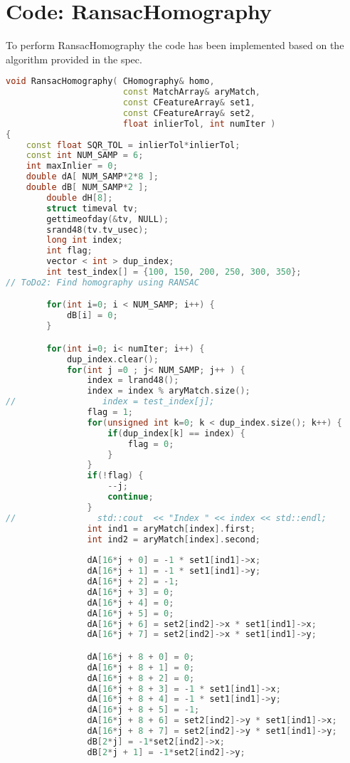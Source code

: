 \documentclass[11pt]{article}
\begin{document}
\section{Code: RansacHomography}
To perform RansacHomography the code has been implemented based on the algorithm provided in the spec.
\begin{lstlisting}[language=C++, caption={RansacHomography}, label=code2]
void RansacHomography( CHomography& homo, 
                       const MatchArray& aryMatch, 
                       const CFeatureArray& set1, 
                       const CFeatureArray& set2, 
                       float inlierTol, int numIter )
{
	const float SQR_TOL = inlierTol*inlierTol;
	const int NUM_SAMP = 6;
	int maxInlier = 0;
	double dA[ NUM_SAMP*2*8 ];
	double dB[ NUM_SAMP*2 ];
        double dH[8];
        struct timeval tv;
        gettimeofday(&tv, NULL);
        srand48(tv.tv_usec);
        long int index;
        int flag;
        vector < int > dup_index;
        int test_index[] = {100, 150, 200, 250, 300, 350};
// ToDo2: Find homography using RANSAC 

        for(int i=0; i < NUM_SAMP; i++) {
            dB[i] = 0;
        }

        for(int i=0; i< numIter; i++) {
            dup_index.clear();
            for(int j =0 ; j< NUM_SAMP; j++ ) {
                index = lrand48();
                index = index % aryMatch.size();
//                 index = test_index[j];
                flag = 1;
                for(unsigned int k=0; k < dup_index.size(); k++) {
                    if(dup_index[k] == index) {
                        flag = 0;
                    }
                }
                if(!flag) {
                    --j;
                    continue;
                }
//                std::cout  << "Index " << index << std::endl;
                int ind1 = aryMatch[index].first;
                int ind2 = aryMatch[index].second;
                
                dA[16*j + 0] = -1 * set1[ind1]->x;
                dA[16*j + 1] = -1 * set1[ind1]->y;
                dA[16*j + 2] = -1;
                dA[16*j + 3] = 0;
                dA[16*j + 4] = 0;
                dA[16*j + 5] = 0;
                dA[16*j + 6] = set2[ind2]->x * set1[ind1]->x;
                dA[16*j + 7] = set2[ind2]->x * set1[ind1]->y;

                dA[16*j + 8 + 0] = 0;
                dA[16*j + 8 + 1] = 0;
                dA[16*j + 8 + 2] = 0;
                dA[16*j + 8 + 3] = -1 * set1[ind1]->x;
                dA[16*j + 8 + 4] = -1 * set1[ind1]->y;
                dA[16*j + 8 + 5] = -1;
                dA[16*j + 8 + 6] = set2[ind2]->y * set1[ind1]->x;
                dA[16*j + 8 + 7] = set2[ind2]->y * set1[ind1]->y;
                dB[2*j] = -1*set2[ind2]->x;
                dB[2*j + 1] = -1*set2[ind2]->y;
                

\end{lstlisting}
\end{document}

